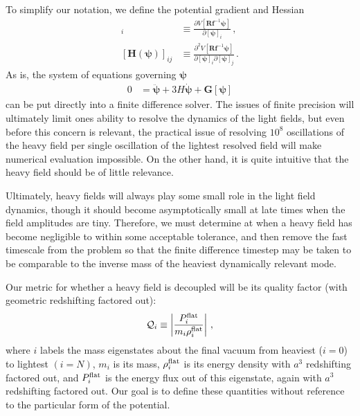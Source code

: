 \documentclass[11pt]{article}
\begin{document}
To simplify our notation, we define the potential gradient and Hessian
\begin{align}
    [\bm G(\bm\psi)]_i&\equiv \frac{\partial V[{\bm R}{\bm f}^{-1}{\bm \psi}]}{\partial{[\bm \psi]_i}}\,,\\
    [\bm H(\bm\psi)]_{ij}&\equiv \frac{\partial^2 V[{\bm R}{\bm f}^{-1}{\bm \psi}]}{\partial{[\bm \psi]_i}\partial{[\bm \psi]_j}}\,.
\end{align}
As is, the system of equations governing $\bm\psi$
\begin{align}
    0&=\ddot{\bm\psi} + 3 H\dot{\bm\psi} + \bm G[{\bm\psi}]
\end{align}
can be put directly into a finite difference solver. The issues of finite precision will ultimately limit ones ability to resolve the dynamics of the light fields, but even before this concern is relevant, the practical issue of resolving $10^8$ oscillations of the heavy field per single oscillation of the lightest resolved field will make numerical evaluation impossible. On the other hand, it is quite intuitive that the heavy field should be of little relevance. 

Ultimately, heavy fields will always play some small role in the light field dynamics, though it should become asymptotically small at late times when the field amplitudes are tiny. Therefore, we must determine at when a heavy field has become negligible to within some acceptable tolerance, and then remove the fast timescale from the problem so that the finite difference timestep may be taken to be comparable to the inverse mass of the heaviest dynamically relevant mode.

Our metric for whether a heavy field is decoupled will be its quality factor (with geometric redshifting factored out):
\begin{align}
    {\cal Q}_i\equiv \left|\frac{P_i^{\rm flat}}{m_i\rho_i^{\rm flat}}\right|\,,
\end{align}
where $i$ labels the mass eigenstates about the final vacuum from heaviest ($i = 0$) to lightest $(i = N)$, $m_i$ is its mass, $\rho_i^{\rm flat}$ is its energy density with $a^3$ redshifting factored out, and $P_i^{\rm flat}$ is the energy flux out of this eigenstate, again with $a^3$ redshifting factored out. Our goal is to define these quantities without reference to the particular form of the potential.
\end{document}
